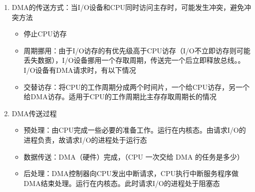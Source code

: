 \documentclass[./computer-organization-and-architecture.tex]{subfiles}
\begin{document}
\begin{enumerate}
\begin{itemize}
        \end{itemize}
        \item DMA的传送方式：当I/O设备和CPU同时访问主存时，可能发生冲突，避免冲突方法
        \begin{itemize}
            \item 停止CPU访存
            \item 周期挪用：由于I/O访存的有优先级高于CPU访存（I/O不立即访存则可能丢失数据），I/O设备挪用一个存取周期，传送完一个{\color{red}{数据字}}后立即释放总线。{\color{red}{单字传送方式}}。I/O设备有DMA请求时，有以下情况
            \item 交替访存：将CPU的工作周期分成两个时间片，一个给CPU访存，另一个给DMA访存。适用于CPU的工作周期比主存存取周期长的情况
        \end{itemize}
        \item DMA传送过程
        \begin{itemize}
            \item 预处理：由CPU完成一些必要的准备工作。运行在内核态。由请求I/O的进程负责，故请求I/O的进程处于运行态
            \item 数据传送：DMA（硬件）完成，{\color{red}{DMA以数据块为基本传送单位}}（CPU 一次交给 DMA 的任务是多少）
            \item 后处理：DMA控制器向CPU发出中断请求，CPU执行中断服务程序做DMA结束处理。运行在内核态。此时请求I/O的进程处于阻塞态
        \end{itemize}
    \end{enumerate}
\end{document}
